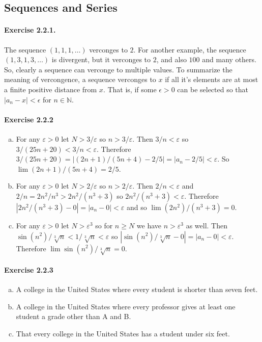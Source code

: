 \documentclass{article}
\newcommand{\N}{\mathbb{N}}
\begin{document}
\subsection{Sequences and Series}
\paragraph{Exercise 2.2.1.}
The sequence $(1,1,1,\ldots)$ verconges to $2$.
For another example, the sequence $(1,3,1,3,\ldots)$ is divergent, but it verconges to $2$, and also $100$ and many others.
So, clearly a sequence can verconge to multiple values.
To summarize the meaning of vercongence, a sequence verconges to $x$ if all it's elements are at most a finite positive distance from $x$.
That is, if some $\epsilon > 0$ can be selected so that $|a_n - x| < \epsilon$ for $n\in \N$.

\paragraph{Exercise 2.2.2}
\begin{enumerate}[(a)]
	\item 
	For any $\varepsilon > 0$ let $N > 3/\varepsilon$ so $n > 3/\varepsilon$. 
	Then $3/n < \varepsilon$ so $3/(25n + 20) < 3/n < \varepsilon$.
	Therefore $3/(25n+20) = |(2n+1)/(5n+4) - 2/5| = |a_n - 2/5| < \varepsilon$.
	So $\lim(2n+1)/(5n+4) = 2/5$.

	\item
	For any $\varepsilon > 0$ let $N > 2/\varepsilon$ so $n > 2/\varepsilon$.
	Then $2/n < \varepsilon$ and $2/n = 2n^2/n^3 > 2n^2/(n^3+3)$ so $2n^2/(n^3+3) < \varepsilon$.
	Therefore $|2n^2/(n^3+3) - 0| = |a_n - 0| < \varepsilon$ and so $\lim(2n^2)/(n^3+3) = 0$.

	\item
	For any $\varepsilon > 0$ let $N > \varepsilon^3$ so for $n \geq N$ we have $n > \varepsilon^3$ as well.
	Then $\sin(n^2)/\sqrt[3]{n} < 1/\sqrt[3]{n} < \varepsilon$ so $|\sin(n^2)/\sqrt[3]{n} - 0| = |a_n - 0| < \varepsilon$.
	Therefore $\lim \sin(n^2)/\sqrt[3]{n} = 0$.
\end{enumerate}

\paragraph{Exercise 2.2.3}
\begin{enumerate}[(a)]
	\item A college in the United States where every student is shorter than seven feet.
	\item A college in the United States where every professor gives at least one student a grade other than A and B.
	\item That every college in the United States has a student under six feet.
\end{enumerate}
\end{document}
